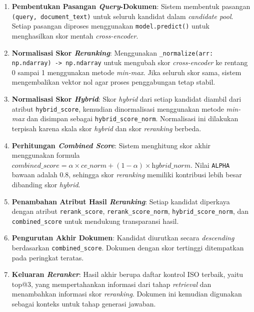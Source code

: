 \documentclass[12pt,a4paper]{article}
\begin{document}
\begin{enumerate}[leftmargin=1.1cm]
\begin{enumerate}[label=\alph*., leftmargin=1.1cm]
\item \textbf{Pembentukan Pasangan \textit{Query}-Dokumen}: Sistem membentuk pasangan \texttt{(query, document\_text)} untuk seluruh kandidat dalam \textit{candidate pool}. Setiap pasangan diproses menggunakan \texttt{model.predict()} untuk menghasilkan skor mentah \textit{cross-encoder}.

\item \textbf{Normalisasi Skor \textit{Reranking}}: Menggunakan \texttt{\_normalize(arr: np.ndarray) -> np.ndarray} untuk mengubah skor \textit{cross-encoder} ke rentang 0 sampai 1 menggunakan metode \textit{min-max}. Jika seluruh skor sama, sistem mengembalikan vektor nol agar proses penggabungan tetap stabil.

\item \textbf{Normalisasi Skor \textit{Hybrid}}: Skor \textit{hybrid} dari setiap kandidat diambil dari atribut \texttt{hybrid\_score}, kemudian dinormalisasi menggunakan metode \textit{min-max} dan disimpan sebagai \texttt{hybrid\_score\_norm}. Normalisasi ini dilakukan terpisah karena skala skor \textit{hybrid} dan skor \textit{reranking} berbeda.

\item \textbf{Perhitungan \textit{Combined Score}}: Sistem menghitung skor akhir menggunakan formula $\textit{combined\_score} = \alpha \times \textit{ce\_norm} + (1 - \alpha) \times \textit{hybrid\_norm}$. Nilai \texttt{ALPHA} bawaan adalah 0.8, sehingga skor \textit{reranking} memiliki kontribusi lebih besar dibanding skor \textit{hybrid}.

\item \textbf{Penambahan Atribut Hasil \textit{Reranking}}: Setiap kandidat diperkaya dengan atribut \texttt{rerank\_score}, \texttt{rerank\_score\_norm}, \texttt{hybrid\_score\_norm}, dan \texttt{combined\_score} untuk mendukung transparansi hasil.

\item \textbf{Pengurutan Akhir Dokumen}: Kandidat diurutkan secara \textit{descending} berdasarkan \texttt{combined\_score}. Dokumen dengan skor tertinggi ditempatkan pada peringkat teratas.

\item \textbf{Keluaran \textit{Reranker}}: Hasil akhir berupa daftar kontrol ISO terbaik, yaitu top@3, yang mempertahankan informasi dari tahap \textit{retrieval} dan menambahkan informasi skor \textit{reranking}. Dokumen ini kemudian digunakan sebagai konteks untuk tahap generasi jawaban.
\end{enumerate}
\end{enumerate}
\end{document}
